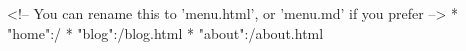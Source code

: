 <!-- You can rename this to 'menu.html', or 'menu.md' if you prefer -->
* "home":/
* "blog":/blog.html
* "about":/about.html
